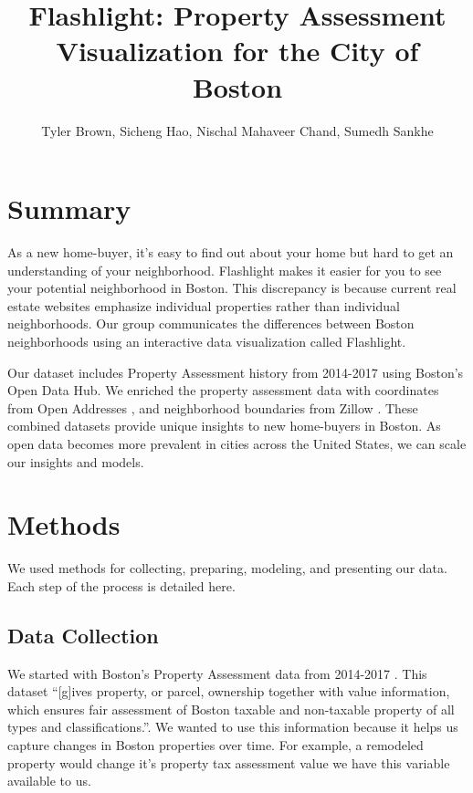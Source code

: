 \documentclass[12pt]{article}
\title{\textbf{Flashlight}: Property Assessment Visualization for the City of Boston}
\author{Tyler Brown, Sicheng Hao, Nischal Mahaveer Chand, Sumedh Sankhe}
\date{ }
\begin{document}
\maketitle

\section*{Summary}

As a new home-buyer, it's easy to find out about your home
but hard to get an understanding of your neighborhood. Flashlight
makes it easier for you to see your potential neighborhood in Boston.
This discrepancy is because current real estate websites emphasize
individual properties rather than individual neighborhoods. Our group
communicates the differences between Boston neighborhoods using an
interactive data visualization called Flashlight.

Our dataset includes Property Assessment history from 2014-2017
\cite{Property49:online} using Boston's Open Data Hub. We enriched the 
property assessment data with coordinates from Open Addresses
\cite{OpenAddr24:online}, and neighborhood boundaries from Zillow
\cite{ZillowNe81:online}. These combined datasets provide unique
insights to new home-buyers in Boston. As open data becomes more
prevalent in cities across the United States, we can scale our insights
and models.



\section*{Methods}

We used methods for collecting, preparing, modeling, and presenting
our data. Each step of the process is detailed here.

\subsection{Data Collection}

We started with Boston's Property Assessment data from 2014-2017
\cite{Property49:online}. This dataset ``[g]ives property, or parcel,
ownership together with value information, which ensures fair assessment
of Boston taxable and non-taxable property of all types and
classifications.''\cite{Property49:online}. We wanted to use this
information because it helps us capture changes in Boston properties
over time. For example, a remodeled property would change it's property
tax assessment value we have this variable available to us.
\end{document}
